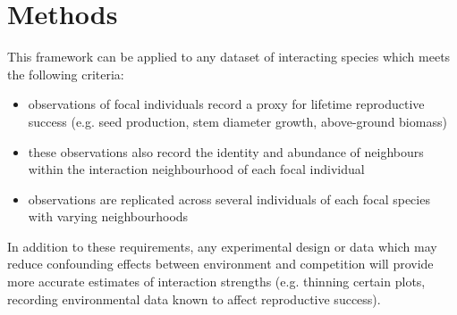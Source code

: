 \documentclass[a4,12pt]{article}
\begin{document}

    
    
\section{Methods}
    
    This framework can be applied to any dataset of interacting species which meets the following criteria: 
    \begin{itemize}
        \item observations of focal individuals record a proxy for lifetime reproductive success (e.g. seed production, stem diameter growth, above-ground biomass)
        \item these observations also record the identity and abundance of neighbours within the interaction neighbourhood of each focal individual
        \item observations are replicated across several individuals of each focal species with varying neighbourhoods
    \end{itemize}
    In addition to these requirements, any experimental design or data which may reduce confounding effects between environment and competition will provide more accurate estimates of interaction strengths (e.g. thinning certain plots, recording environmental data known to affect reproductive success). 
    
\end{document}
